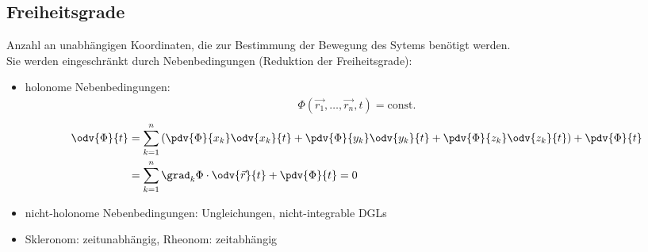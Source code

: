 \subsection{Freiheitsgrade}
Anzahl an unabhängigen Koordinaten, die zur Bestimmung der Bewegung des Sytems benötigt werden.\\
Sie werden eingeschränkt durch Nebenbedingungen (Reduktion der Freiheitsgrade):
\begin{itemize}
	\item holonome Nebenbedingungen:\\
	\begin{align*}
		\Phi(\vec{r_1},\dots, \vec{r_n},t)=\text{const.}
	\end{align*}
	\begin{align*}
		\odv{\Phi}{t}&=\sum\limits_{k=1}^n\left(\pdv{\Phi}{x_k}\odv{x_k}{t}+\pdv{\Phi}{y_k}\odv{y_k}{t}+\pdv{\Phi}{z_k}\odv{z_k}{t}\right)+\pdv{\Phi}{t}\\
		&=\sum\limits_{k=1}^n\grad_k\Phi\cdot\odv{\vec{r}}{t}+\pdv{\Phi}{t}=0
	\end{align*}
	\item nicht-holonome Nebenbedingungen: Ungleichungen, nicht-integrable DGLs
	\item Skleronom: zeitunabhängig, Rheonom: zeitabhängig
\end{itemize}

